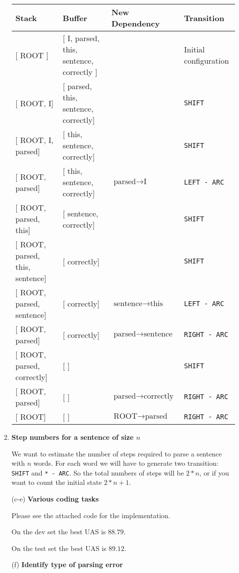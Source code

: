 \documentclass{article}
\begin{document}
\begin{enumerate}[leftmargin=0pt,listparindent=0pt]
\begin{enumerate}[leftmargin=0pt,listparindent=0pt]
\begin{tabular}{l|l|l|l}
Stack & Buffer & New Dependency & Transition \\
\midrule
{[ ROOT ]} & [ I, parsed, this, sentence, correctly ] & & Initial configuration\\
{[ ROOT, I]} & [ parsed, this, sentence, correctly] & & \texttt{SHIFT} \\
{[ ROOT, I, parsed]} & [ this, sentence, correctly] & & \texttt{SHIFT} \\
{[ ROOT, parsed]} & [ this, sentence, correctly] & \(\text{parsed} \rightarrow \text{I}\) & \texttt{LEFT - ARC} \\
{[ ROOT, parsed, this]} & [ sentence, correctly] &  & \texttt{SHIFT} \\
{[ ROOT, parsed, this, sentence]} & [ correctly] &  & \texttt{SHIFT} \\
{[ ROOT, parsed, sentence]} & [ correctly] & \(\text{sentence} \rightarrow \text{this}\) & \texttt{LEFT - ARC} \\
{[ ROOT, parsed]} & [ correctly] & \(\text{parsed} \rightarrow \text{sentence}\) & \texttt{RIGHT - ARC} \\
{[ ROOT, parsed, correctly]} & [ ] & & \texttt{SHIFT} \\
{[ ROOT, parsed]} & [ ] & \(\text{parsed} \rightarrow \text{correctly}\)& \texttt{RIGHT - ARC} \\
{[ ROOT]} & [ ] & \(\text{ROOT} \rightarrow \text{parsed}\)& \texttt{RIGHT - ARC} \\
\bottomrule
\end{tabular}

\item \textbf{Step numbers for a sentence of size $n$}

We want to estimate the number of steps required to parse a sentence with $n$ words. For each word we will have to generate two transition: \texttt{SHIFT} and \texttt{* - ARC}. So the total numbers of steps will be $ 2 * n $, or if you want to count the initial state $ 2 *n + 1 $.

\item[(c-e)] \textbf{Various coding tasks}

Please see the attached code for the implementation.

On the dev set the best UAS is $88.79$.

On the test set the best UAS is $89.12$.

\item[(f)] \textbf{Identify type of parsing error}


\end{enumerate}
\end{enumerate}
\end{document}
